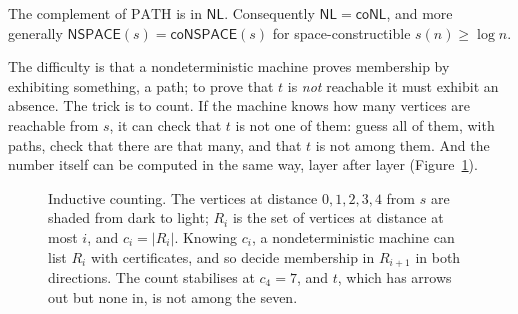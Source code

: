 \begin{theorem}\label{thm:immerman}
The complement of $\mathrm{PATH}$ is in $\mathsf{NL}$. Consequently $\mathsf{NL}=\mathsf{coNL}$, and more generally $\mathsf{NSPACE}(s)=\mathsf{coNSPACE}(s)$ for space-constructible $s(n)\ge\log n$.
\end{theorem}

The difficulty is that a nondeterministic machine proves membership by exhibiting something, a path; to prove that $t$ is \emph{not} reachable it must exhibit an absence. The trick is to count. If the machine knows how many vertices are reachable from $s$, it can check that $t$ is not one of them: guess all of them, with paths, check that there are that many, and that $t$ is not among them. And the number itself can be computed in the same way, layer after layer (Figure~\ref{fig:counting}).

\begin{figure}[ht]
\centering
{}
\caption{Inductive counting. The vertices at distance $0,1,2,3,4$ from $s$ are shaded from dark to light; $R_i$ is the set of vertices at distance at most $i$, and $c_i=|R_i|$. Knowing $c_i$, a nondeterministic machine can list $R_i$ with certificates, and so decide membership in $R_{i+1}$ in both directions. The count stabilises at $c_4=7$, and $t$, which has arrows out but none in, is not among the seven.}
\label{fig:counting}
\end{figure}

